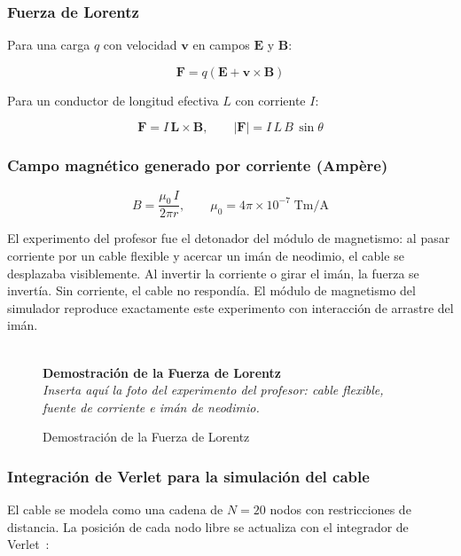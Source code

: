 \documentclass[12pt, a4paper]{article}
\newcommand{\figplaceholder}[2]{%
  \begin{figure}[H]
    \centering
    \begin{tcolorbox}[
      colback=white, colframe=gray!40,
      width=0.9\linewidth,
      halign=center, valign=center,
      height=4.5cm,
      enhanced, sharp corners,
      borderline={0.5pt}{0pt}{gray!40, dashed}
    ]
      \centering
      \textcolor{gray!60}{\Large } \\[4pt]
      \textbf{\textcolor{gray!70}{#1}} \\[2pt]
      \textit{\small\textcolor{gray!60}{#2}}
    \end{tcolorbox}
    \caption{#1}
    \label{fig:#1}
  \end{figure}%
}
\begin{document}
\subsubsection{Fuerza de Lorentz}

Para una carga $q$ con velocidad $\mathbf{v}$ en campos $\mathbf{E}$ y
$\mathbf{B}$:

\begin{equation}
  \mathbf{F} = q(\mathbf{E} + \mathbf{v} \times \mathbf{B})
  \label{eq:lorentz_completa}
\end{equation}

Para un conductor de longitud efectiva $L$ con corriente $I$:

\begin{equation}
  \mathbf{F} = I\,\mathbf{L} \times \mathbf{B}, \qquad
  |\mathbf{F}| = I\,L\,B\,\sin\theta
  \label{eq:lorentz_cable}
\end{equation}

\subsubsection{Campo magnético generado por corriente (Ampère)}

\begin{equation}
  B = \frac{\mu_0\, I}{2\pi r}, \qquad
  \mu_0 = 4\pi \times 10^{-7} \;\si{\tesla\metre\per\ampere}
  \label{eq:ampere}
\end{equation}

\begin{cajaclas}
El experimento del profesor fue el detonador del módulo de magnetismo: al
pasar corriente por un cable flexible y acercar un imán de neodimio, el
cable se desplazaba visiblemente. Al invertir la corriente o girar el imán,
la fuerza se invertía. Sin corriente, el cable no respondía. El módulo de
magnetismo del simulador reproduce exactamente este experimento con
interacción de arrastre del imán.
\end{cajaclas}

\figplaceholder{Demostración de la Fuerza de Lorentz}
{Inserta aquí la foto del experimento del profesor: cable flexible, fuente de corriente e imán de neodimio.}

\subsubsection{Integración de Verlet para la simulación del cable}

El cable se modela como una cadena de $N = 20$ nodos con restricciones de
distancia. La posición de cada nodo libre se actualiza con el integrador de
Verlet~\cite{verlet1967}:
\end{document}
